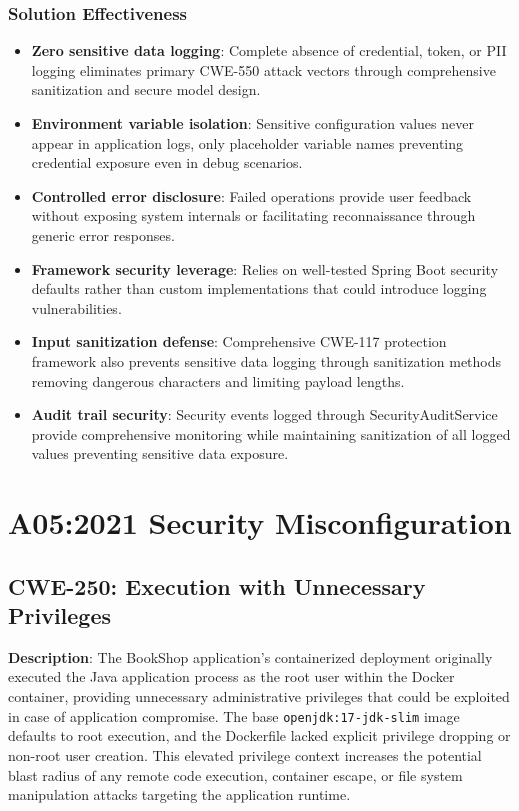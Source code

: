 \documentclass[]{UCD_CS_FYP_Report}
\begin{document}
\subsection*{Solution Effectiveness}
\begin{itemize}
	\item \textbf{Zero sensitive data logging}: Complete absence of credential, token, or PII logging eliminates primary CWE-550 attack vectors through comprehensive sanitization and secure model design.
	\item \textbf{Environment variable isolation}: Sensitive configuration values never appear in application logs, only placeholder variable names preventing credential exposure even in debug scenarios.
	\item \textbf{Controlled error disclosure}: Failed operations provide user feedback without exposing system internals or facilitating reconnaissance through generic error responses.
	\item \textbf{Framework security leverage}: Relies on well-tested Spring Boot security defaults rather than custom implementations that could introduce logging vulnerabilities.
	\item \textbf{Input sanitization defense}: Comprehensive CWE-117 protection framework also prevents sensitive data logging through sanitization methods removing dangerous characters and limiting payload lengths.
	\item \textbf{Audit trail security}: Security events logged through SecurityAuditService provide comprehensive monitoring while maintaining sanitization of all logged values preventing sensitive data exposure.
\end{itemize}



\chapter{A05:2021 Security Misconfiguration}


\section{CWE-250: Execution with Unnecessary Privileges}

\textbf{Description}: The BookShop application's containerized deployment originally executed the Java application process as the root user within the Docker container, providing unnecessary administrative privileges that could be exploited in case of application compromise. The base \texttt{openjdk:17-jdk-slim} image defaults to root execution, and the Dockerfile lacked explicit privilege dropping or non-root user creation. This elevated privilege context increases the potential blast radius of any remote code execution, container escape, or file system manipulation attacks targeting the application runtime.
\end{document}

